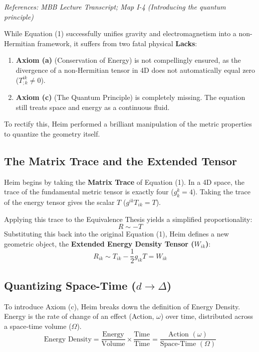 \documentclass[11pt,a4paper,oneside]{article}
\begin{document}
\textit{References: MBB Lecture Transcript; Map I-4 (Introducing the quantum principle)}

While Equation (1) successfully unifies gravity and electromagnetism into a non-Hermitian framework, it suffers from two fatal physical \textbf{Lacks}:
\begin{enumerate}
    \item \textbf{Axiom (a)} (Conservation of Energy) is not compellingly ensured, as the divergence of a non-Hermitian tensor in 4D does not automatically equal zero ($T^{ik}_{;k} \neq 0$).
    \item \textbf{Axiom (c)} (The Quantum Principle) is completely missing. The equation still treats space and energy as a continuous fluid.
\end{enumerate}

To rectify this, Heim performed a brilliant manipulation of the metric properties to quantize the geometry itself.

\subsection{The Matrix Trace and the Extended Tensor}

Heim begins by taking the \textbf{Matrix Trace} of Equation (1). In a 4D space, the trace of the fundamental metric tensor is exactly four ($g^k_k = 4$). Taking the trace of the energy tensor gives the scalar $T$ ($g^{ik}T_{ik} = T$). 

Applying this trace to the Equivalence Thesis yields a simplified proportionality:
\begin{equation}
    R \sim -T
\end{equation}
Substituting this back into the original Equation (1), Heim defines a new geometric object, the \textbf{Extended Energy Density Tensor ($W_{ik}$)}:
\begin{equation}
    R_{ik} \sim T_{ik} - \frac{1}{2}g_{ik}T = W_{ik}
\end{equation}

\subsection{Quantizing Space-Time (\texorpdfstring{$d \to \Delta$}{d to Delta})}

To introduce Axiom (c), Heim breaks down the definition of Energy Density. Energy is the rate of change of an effect (Action, $\omega$) over time, distributed across a space-time volume ($\Omega$). 
\begin{equation}
    \text{Energy Density} = \frac{\text{Energy}}{\text{Volume}} \times \frac{\text{Time}}{\text{Time}} = \frac{\text{Action } (\omega)}{\text{Space-Time } (\Omega)}
\end{equation}
\end{document}
